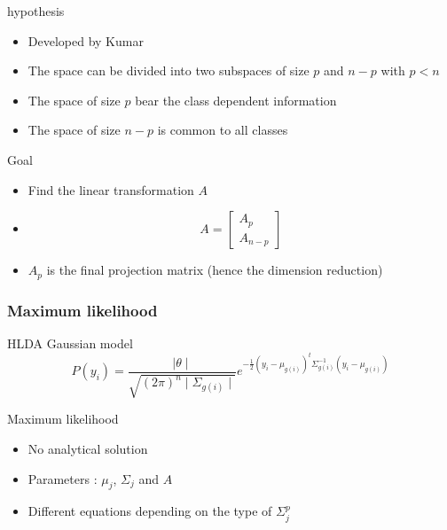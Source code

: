 \documentclass[smaller,pdf,svgnames]{beamer}
\begin{document}
\begin{frame}
  \begin{block}{hypothesis}
    \begin{itemize}
    \item Developed by Kumar \cite{kumar.1997}
    \item The space can be divided into two subspaces of size $p$ and $n-p$ with $p < n$
    \item The space of size $p$ bear the class dependent information
    \item The space of size $n-p$ is common to all classes
    \end{itemize}
  \end{block}

  \begin{block}{Goal}
    \begin{itemize}
      \item Find the linear transformation $A$
      \item
        $$A = \left [
          \begin{array}{c}
            A_p\\
            A_{n-p}
          \end{array}
        \right ]
        $$
      \item $A_p$ is the final projection matrix (hence the dimension reduction)
    \end{itemize}
  \end{block}
\end{frame}

\begin{frame}
  \frametitle{Maximum likelihood}

  \begin{block}{HLDA Gaussian model}
    $$P(y_i) = \frac{\mid \theta \mid}{\sqrt{(2\pi)^n \mid \Sigma_{g(i)} \mid}}
    e^{-\frac{1}{2} (y_i - \mu_{g(i)})^t \Sigma_{g(i)}^{-1} (y_i - \mu_{g(i)})}$$
  \end{block}

  \begin{block}{Maximum likelihood}
    \begin{itemize}
      \item No analytical solution
      \item Parameters : $\mu_j$, $\Sigma_j$ and $A$
      \item Different equations depending on the type of $\Sigma_j^p$
    \end{itemize}
  \end{block}

\end{frame}
\end{document}
